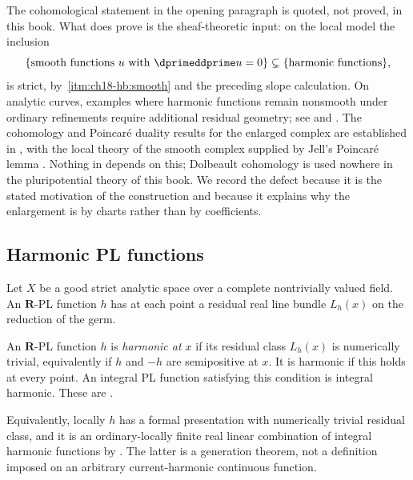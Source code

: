 \begin{remark}
\label{rem:ch18-cohomology}
The cohomological statement in the opening paragraph is quoted, not proved,
in this book.  What  does prove is the
sheaf-theoretic input: on the local model the inclusion
\[
 \{\text{smooth functions }u\text{ with }\dprimeddprime u=0\}
 \subsetneq
 \{\text{harmonic functions}\},
\]
is strict, by \,\cref{itm:ch18-hb:smooth}
and the preceding slope calculation.  On analytic curves, examples where
harmonic functions remain nonsmooth under ordinary refinements require
additional residual geometry; see \cite[Remark~15.10]{GJR26} and
.  The cohomology and
Poincar\'e duality results for the enlarged complex are established in
\cite[\S\S10 and 13]{GJR26}, with the local theory of the smooth complex
supplied by Jell's Poincar\'e lemma \cite{Jell16}.  Nothing in
 depends on this;
Dolbeault cohomology is used nowhere in the pluripotential theory of this
book.  We record the defect because it is the stated motivation of the
construction and because it explains why the enlargement is by charts rather
than by coefficients.
\end{remark}

\subsection{Harmonic PL functions}
\label{sec:ch18-harmonic-pl}

Let $X$ be a good strict analytic space over a complete nontrivially valued
field.  An $\mathbf R$-PL function $h$ has at each point a residual real
line bundle $L_h(x)$ on the reduction of the germ.

\begin{definition}
\label{def:ch18-harmonic-pl}
An $\mathbf R$-PL function $h$ is \emph{harmonic at $x$} if its residual
class $L_h(x)$ is numerically trivial, equivalently if $h$ and $-h$ are
semipositive at $x$.  It is harmonic if this holds at every point.  An
integral PL function satisfying this condition is integral harmonic.
These are \cite[Definition~7.2 and Remark~7.3]{GJR26}.

Equivalently, locally $h$ has a formal presentation with numerically trivial
residual class, and it is an ordinary-locally finite real linear combination
of integral harmonic functions by \cite[Proposition~7.5]{GJR26}.  The
latter is a generation theorem, not a definition imposed on an arbitrary
current-harmonic continuous function.
\end{definition}

